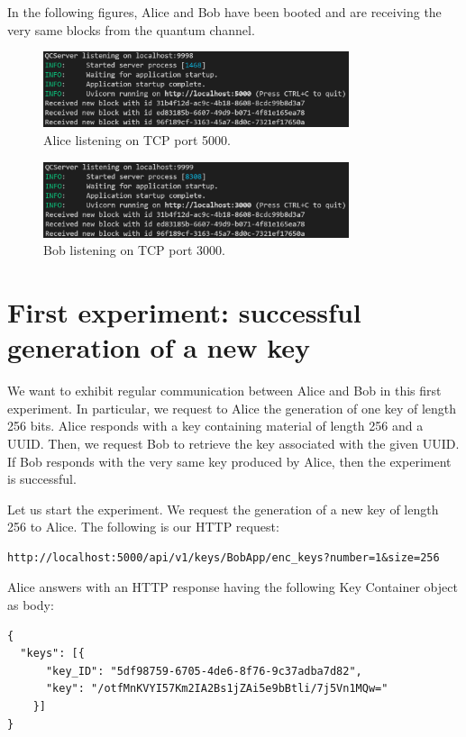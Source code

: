 In the following figures, Alice and Bob have been booted and are receiving the very same blocks from the quantum channel.

\begin{figure}[H]
    \centering
    \includegraphics[width=0.8\textwidth]{Images/alice.png}
    \caption{Alice listening on TCP port 5000.}
    \label{fig:alice}
\end{figure}

\begin{figure}[H]
    \centering
    \includegraphics[width=0.8\textwidth]{Images/bob.png}
    \caption{Bob listening on TCP port 3000.}
    \label{fig:bob}
\end{figure}

\section{First experiment: successful generation of a new key}
We want to exhibit regular communication between Alice and Bob in this first experiment. In particular, we request to Alice the generation of one key of length 256 bits. Alice responds with a key containing material of length 256 and a UUID.
Then, we request Bob to retrieve the key associated with the given UUID. If Bob responds with the very same key produced by Alice, then the experiment is successful.

Let us start the experiment. We request the generation of a new key of length 256 to Alice. The following is our HTTP request:

\begin{verbatim}
http://localhost:5000/api/v1/keys/BobApp/enc_keys?number=1&size=256
\end{verbatim}

Alice answers with an HTTP response having the following Key Container object as body:

\begin{verbatim}
{
  "keys": [{
      "key_ID": "5df98759-6705-4de6-8f76-9c37adba7d82",
      "key": "/otfMnKVYI57Km2IA2Bs1jZAi5e9bBtli/7j5Vn1MQw="
    }]
}
\end{verbatim}

